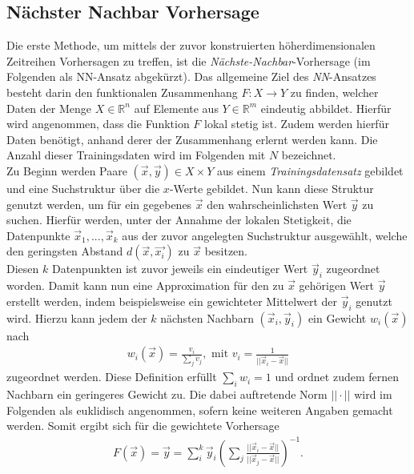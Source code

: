 \subsection{Nächster Nachbar Vorhersage}
\label{sc:theory_nn}
Die erste Methode, um mittels der zuvor konstruierten höherdimensionalen Zeitreihen Vorhersagen zu treffen, ist die \textit{Nächste-Nachbar}-Vorhersage (im Folgenden als \textsc{NN}-Ansatz abgekürzt). Das allgemeine Ziel des \textit{NN}-Ansatzes besteht darin den funktionalen Zusammenhang $F : X \rightarrow Y$ zu finden, welcher Daten der Menge $X \in \mathbb{R}^n$ auf Elemente aus $Y \in \mathbb{R}^m$ eindeutig abbildet. Hierfür wird angenommen, dass die Funktion $F$ lokal stetig ist. Zudem werden hierfür Daten benötigt, anhand derer der Zusammenhang erlernt werden kann. Die Anzahl dieser Trainingsdaten wird im Folgenden mit $N$ bezeichnet.\\
Zu Beginn werden Paare $(\vec{x},\vec{y}) \in X \times Y$ aus einem \textit{Trainingsdatensatz} gebildet und eine Suchstruktur über die $x$-Werte gebildet. Nun kann diese Struktur genutzt werden, um für ein gegebenes $\vec{x}$ den wahrscheinlichsten Wert $\vec{y}$ zu suchen. Hierfür werden, unter der Annahme der lokalen Stetigkeit, die Datenpunkte $\vec{x}_1, ..., \vec{x}_k$ aus der zuvor angelegten Suchstruktur ausgewählt, welche den geringsten Abstand $d(\vec{x}, \vec{x_i})$ zu $\vec{x}$ besitzen.\\
Diesen $k$ Datenpunkten ist zuvor jeweils ein eindeutiger Wert $\vec{y}_i$ zugeordnet worden. Damit kann nun eine Approximation für den zu $\vec{x}$ gehörigen Wert $\vec{y}$ erstellt werden, indem beispielsweise ein gewichteter Mittelwert der $\vec{y}_i$ genutzt wird. Hierzu kann jedem der $k$ nächsten Nachbarn $(\vec{x}_i, \vec{y}_i)$ ein Gewicht $w_i(\vec{x})$ nach
\begin{align*}
w_i(\vec{x}) = \frac{v_i}{\sum_j v_j}, \text{ mit } v_i = \frac{1}{||\vec{x}_i-\vec{x}||} 
\end{align*}
zugeordnet werden. Diese Definition erfüllt $\sum_i w_i = 1$ und ordnet zudem fernen Nachbarn ein geringeres Gewicht zu. Die dabei auftretende Norm $||\cdot ||$ wird im Folgenden als euklidisch angenommen, sofern keine weiteren Angaben gemacht werden. Somit ergibt sich für die gewichtete Vorhersage
\begin{align}
F(\vec{x}) = \vec{y} = \sum^k_i \vec{y}_i \left( \sum_j \frac{||\vec{x}_i-\vec{x}||}{||\vec{x}_j-\vec{x}||} \right) ^{-1}.
\end{align}

